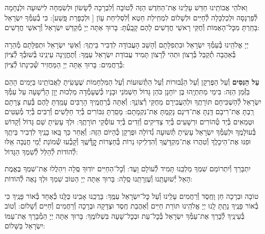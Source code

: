 \documentclass[twoside, openany, parskip=half, 11pt]{book}
\begin{document}
וֵאלֹהֵי אֲבוֹתֵֽינוּ חַדֵּשׁ עָלֵֽינוּ אֶת־הַחֹֽדֶשׁ הַזֶּה לְ֯טוֹבָה וְ֯לִבְרָכָה לְ֯שָׂשׂוֹן וּלְשִׂמְחָה לִישׁוּעָה וּלְנֶחָמָה לְ֯פַרְנָסָה וּלְכַלְכָּלָה לְ֯חַיִּים וּלְשָׁלוֹם לִמְחִֽילַת חֵטְא וְ֯לִסְלִיחַת עָוֹן [
וּלְכַפָּרַת פָּֽשַׁע]: כִּי בְ֯עַמְּ֯ךָ יִשְׂרָאֵל בָּחַֽרְתָּ מִכׇּל־הָאֻמּוֹת וְ֯חֻקֵּי רָאשֵׁי חֳדָשִׁים לָהֶם קָבָֽעְ֯תָּ: בָּרוּךְ אַתָּה יְיָ מְ֯קַדֵּשׁ יִשְׂרָאֵל וְ֯רָאשֵׁי חֳדָשִׁים:

\nextpage
{}
יְיָ אֱלֹהֵֽינוּ בְּ֯עַמְּ֯ךָ יִשְׂרָאֵל וּבִתְפִלָּתָם וְ֯הָשֵׁב הָעֲבוֹדָה לִדְבִיר בֵּיתֶֽךָ: וְ֯אִשֵּׁי יִשְׂרָאֵל וּתְפִלָּתָם מְ֯הֵרָה בְּ֯אַהֲבָה תְ֯קַבֵּל בְּ֯רָצוֹן וּתְהִי לְ֯רָצוֹן תָּמִיד עֲבוֹדַת יִשְׂרָאֵל עַמֶּֽךָ: וְ֯תֶחֱזֶֽינָה עֵינֵֽינוּ בְּ֯שׁוּבְ֯ךָ לְ֯צִיּוֹן בְּ֯רַחֲמִים: בָּרוּךְ אַתָּה יְיָ הַמַּחֲזִיר שְׁ֯כִינָתוֹ לְ֯צִיּוֹן:

\modim

\enlargethispage{\baselineskip}

\begin{sometimes}

\textbf{עַל הַנִּסִּים}
וְ֯עַל הַפֻּרְקָן וְ֯עַל הַגְּ֯בוּרוֹת וְ֯עַל הַתְּ֯שׁוּעוֹת וְ֯עַל הַמִּלְחָמוֹת
שֶׁעָשִֽׂיתָ לַאֲבוֹתֵֽינוּ בַּיָּמִים הָהֵם בַּזְּ֯מַן הַזֶּה:
בִּימֵי מַתִּתְיָֽהוּ בֶּן יוֹחָנָן כֹּהֵן גָּדוֹל חַשְׁמֹנַי וּבָנָיו כְּ֯שֶׁעָמְ֯דָה מַלְכוּת יָוָן הָרְ֯שָׁעָה עַל עַמְּ֯ךָ יִשְׂרָאֵל לְ֯הַשְׁכִּיחָם תּוֹרָתֶֽךָ וּלְהַעֲבִירָם מֵחֻקֵּי רְ֯צוֹנֶֽךָ: וְ֯אַתָּה בְּ֯רַחֲמֶֽיךָ הָרַבִּים עָמַֽדְתָּ לָהֶם בְּ֯עֵת צָרָתָם רַֽבְתָּ אֶת־רִיבָם דַּֽנְתָּ אֶת־דִּינָם נָקַֽמְתָּ אֶת־נִקְמָתָם: מָסַֽרְתָּ גִּבּוֹרִים בְּ֯יַד חַלָּשִׁים וְ֯רַבִּים בְּ֯יַד מְ֯עַטִּים וּטְמֵאִים בְּ֯יַד טְ֯הוֹרִים וּרְשָׁעִים בְּ֯יַד צַדִּיקִים וְ֯זֵדִים בְּ֯יַד עוֹסְ֯קֵי תוֹרָתֶֽךָ: וּלְךָ עָשִֽׂיתָ שֵׁם גָּדוֹל וְ֯קָדוֹשׁ בְּ֯עוֹלָמֶֽךָ וּלְעַמְּ֯ךָ יִשְׂרָאֵל עָשִֽׂיתָ תְּ֯שׁוּעָה גְ֯דוֹלָה וּפֻרְקָן כְּ֯הַיּוֹם הַזֶּה: וְ֯אַֽחַר כַּךְ בָּֽאוּ בָנֶֽיךָ לִדְבִיר בֵּיתֶֽךָ וּפִנּוּ אֶת־הֵיכָלֶֽךָ וְ֯טִהֲרוּ אֶת־מִקְדָּשֶֽׁךָ וְ֯הִדְלִֽיקוּ נֵרוֹת בְּ֯חַצְרוֹת קׇׇׇׇׇׇׇדְּ֯שֶֽׁךָ וְ֯קָבְ֯עוּ שְׁ֯מוֹנַת יְ֯מֵי חֲנֻכָּה אֵֽלּוּ לְ֯הוֹדוֹת לְ֯הַלֵּל לְ֯שִׁמְךָ הַגָּדוֹל:

\end{sometimes}

\nextpage

יִתְבָּרַךְ וְ֯יִתְרוֹמַם שִׁמְךָ מַלְכֵּֽנוּ תָּמִיד לְ֯עוֹלָם וָעֶד:
וְ֯כׇל־הַחַיִּים יוֹדֽוּךָ סֶּֽלָה וִיהַלֲלוּ אֶת־שִׁמְךָ בֶּאֱמֶת הָאֵל יְ֯שׁוּעָתֵֽנוּ וְ֯עֶזְרָתֵֽנוּ סֶֽלָה: בָּרוּךְ אַתָּה יְיָ הַטּוֹב שִׁמְךָ וּלְךָ נָאֶה לְ֯הוֹדוֹת:


טוֹבָה וּבְרָכָה חֵן וָחֶֽסֶד וְ֯רַחֲמִים עָלֵֽינוּ וְ֯עַל כׇּל־יִשְׂרָאֵל עַמֶּֽךָ: בָּרֲכֵֽנוּ אָבִֽינוּ כֻּלָּֽנוּ כְּ֯אֶחָד בְּ֯אוֹר פָּנֶֽיךָ כִּי בְ֯אוֹר פָּנֶֽיךָ נָתַֽתָּ לָֽנוּ יְיָ אֱלֹהֵֽינוּ תּוֹרַת חַיִּים וְ֯אַהֲבַת חֶֽסֶד וּצְדָקָה וּבְרָכָה וְ֯רַחֲמִים וְ֯חַיִּים וְ֯שָׁלוֹם: וְ֯טוֹב בְּ֯עֵינֶֽיךָ לְ֯בָרֵךְ אֶת־עַמְּ֯ךָ יִשְׂרָאֵל בְּ֯כׇל־עֵת וּבְכׇל־שָׁעָה בִּשְׁלוֹמֶֽךָ: בָּרוּךְ אַתָּה יְיָ הַמְ֯בָרֵךְ אֶת־עַמּוֹ יִשְׂרָאֵל בַּשָּׁלוֹם:
\end{document}
